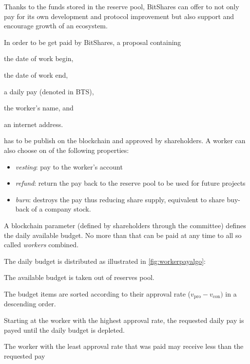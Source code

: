 Thanks to the funds stored in the reserve pool, BitShares can offer to not only
pay for its own development and protocol improvement but also support and
encourage growth of an ecosystem.

In order to be get paid by BitShares, a proposal containing
\begin{inparaenum}[(a)]
 \item the date of work begin,
 \item the date of work end,
 \item a daily pay (denoted in BTS),
 \item the worker's name, and
 \item an internet address.
\end{inparaenum}
has to be publish on the blockchain and approved by shareholders.
A worker can also choose on of the following properties:
\begin{itemize}
 \item \emph{vesting}: pay to the worker's account
 \item \emph{refund}: return the pay back to the reserve pool to be used for
                      future projects
 \item \emph{burn}: destroys the pay thus reducing share supply, equivalent to
                    share buy-back of a company stock.
\end{itemize}

A blockchain parameter (defined by shareholders through the committee) defines
the daily available budget. No more than that can be paid at any time to all so
called \emph{workers} combined.

The daily budget is distributed as illustrated in \cref{fig:workerpayalgo}: 
\begin{inparaenum}[(1)]
 \item The available budget is taken out of reserves pool.
 \item The budget items are sorted according to their approval rate
       ($v_\text{pro}-v_\text{con})$ in a descending order.
 \item Starting at the worker with the highest approval rate, the requested
       daily pay is payed until the daily budget is depleted.
 \item The worker with the least approval rate that was paid may receive less
       than the requested pay
\end{inparaenum}

